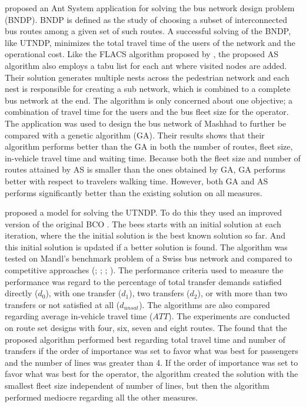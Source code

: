 \citet{poorzahedy11} proposed an Ant System application for solving the bus network design problem (BNDP). BNDP is defined as the study of choosing a subset of interconnected bus routes among a given set of such routes. A successful solving of the BNDP, like UTNDP, minimizes the total travel time of the users of the network and the operational cost. Like the FLACS algorithm proposed by \citet{salehinejad10}, the proposed AS algorithm also employs a tabu list for each ant where visited nodes are added. Their solution generates multiple nests across the pedestrian network and each nest is responsible for creating a sub network, which is combined to a complete bus network at the end. The algorithm is only concerned about one objective; a combination of travel time for the users and the bus fleet size for the operator. The application was used to design the bus network of Mashhad to further be compared with a genetic algorithm (GA). Their results shows that their algorithm performs better than the GA in both the number of routes, fleet size, in-vehicle travel time and waiting time. Because both the fleet size and number of routes attained by AS is smaller than the ones obtained by GA, GA performs better with respect to travelers walking time. However, both GA and AS performs significantly better than the existing solution on all measures.  

\citet{nikolic14} proposed a model for solving the UTNDP. To do this they used an improved version of the original BCO \citep{lucic03}. The bees starts with an initial solution at each iteration, where the the initial solution is the best known solution so far. And this initial solution is updated if a better solution is found. The algorithm was tested on Mandl's benchmark problem of a Swiss bus network\citep{mandl80} and compared to competitive approaches (\citet{mandl80}; \citet{shih94}; \citet{baaj95}; \citet{bagloee11}). The performance criteria used to measure the performance was regard to the percentage of total transfer demands satisfied directly ($d_0$), with one transfer ($d_1$), two transfers ($d_2$), or with more than two transfers or not satisfied at all ($d_{unsat}$). The algorithms are also compared regarding average in-vehicle travel time ($ATT$). The experiments are conducted on route set designs with four, six, seven and eight routes. The found that the proposed algorithm performed best regarding total travel time and number of transfers if the order of importance was set to favor what was best for passengers and the number of lines was greater than 4. If the order of importance was set to favor what was best for the operator, the algorithm created the solution with the smallest fleet size independent of number of lines, but then the algorithm performed mediocre regarding all the other measures. 

